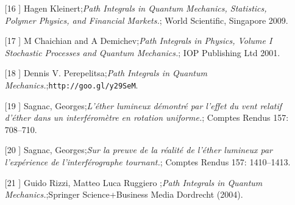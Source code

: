 \begin{itemize}
\item[[16]]  Hagen Kleinert;\textit{Path Integrals in Quantum Mechanics, Statistics, Polymer Physics, and Financial Markets.};  World Scientific, Singapore 2009.
\item[[17]]  M Chaichian and A Demichev;\textit{Path Integrals in Physics, Volume I
Stochastic Processes and Quantum Mechanics.};  IOP Publishing Ltd 2001.
\item[[18]] Dennis V. Perepelitsa;\textit{Path Integrals in Quantum Mechanics.};\texttt{http://goo.gl/y29SeM}.
\item[[19]] Sagnac, Georges;\textit{L'éther lumineux démontré par l'effet du vent relatif d'éther dans un interféromètre en rotation uniforme.}; Comptes Rendus 157: 708–710.
\item[[20]] Sagnac, Georges;\textit{Sur la preuve de la réalité de l'éther lumineux par l'expérience de l'interférographe tournant.};  Comptes Rendus 157: 1410–1413.
\item[[21]] Guido Rizzi, Matteo Luca Ruggiero ;\textit{Path Integrals in Quantum Mechanics.};Springer Science+Business Media Dordrecht (2004).
\end{itemize}
